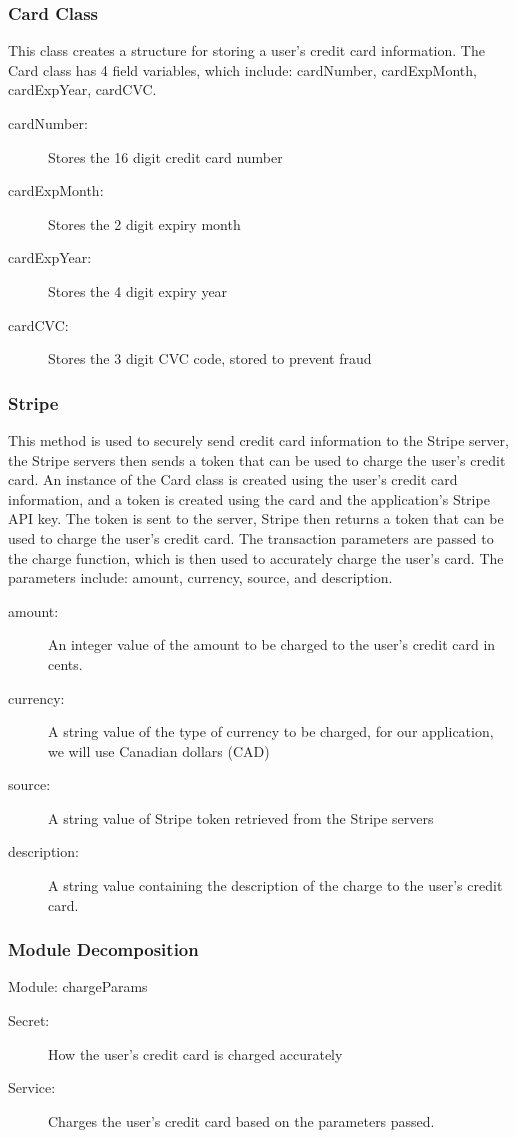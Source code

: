 \documentclass[12pt, titlepage]{article}
\begin{document}
\subsubsection{Card Class}
This class creates a structure for storing a user's credit card information. The Card class has 4 field variables, which include: cardNumber, cardExpMonth, cardExpYear, cardCVC.

\begin{description}
  \item[cardNumber:] Stores the 16 digit credit card number 
  \item[cardExpMonth:] Stores the 2 digit expiry month 
  \item[cardExpYear:] Stores the 4 digit expiry year
  \item[cardCVC:] Stores the 3 digit CVC code, stored to prevent fraud
\end{description}

\subsubsection{Stripe}
This method is used to securely send credit card information to the Stripe server, the Stripe servers then sends a token that can be used to charge the user's credit card. An instance of the Card class is created using the user's credit card information, and a token is created
using the card and the application's Stripe API key. The token is sent to the server, Stripe then returns a token that can be used to charge the user's credit card. The transaction parameters are passed to the charge function, which is then used to accurately charge the user's card.
The parameters include: amount, currency, source, and description.
  
\begin{description}
  \item[amount:] An integer value of the amount to be charged to the user's credit card in cents.
  \item[currency:] A string value of the type of currency to be charged, for our application, we will use Canadian dollars (CAD) 
  \item[source:] A string value of Stripe token retrieved from the Stripe servers 
  \item[description:] A string value containing the description of the charge to the user's credit card.
\end{description}

\subsubsection{Module Decomposition}
Module: chargeParams
\begin{description}
	\item[Secret:]How the user's credit card is charged accurately
	\item[Service:] Charges the user's credit card based on the parameters passed.
\end{description}
\end{document}
